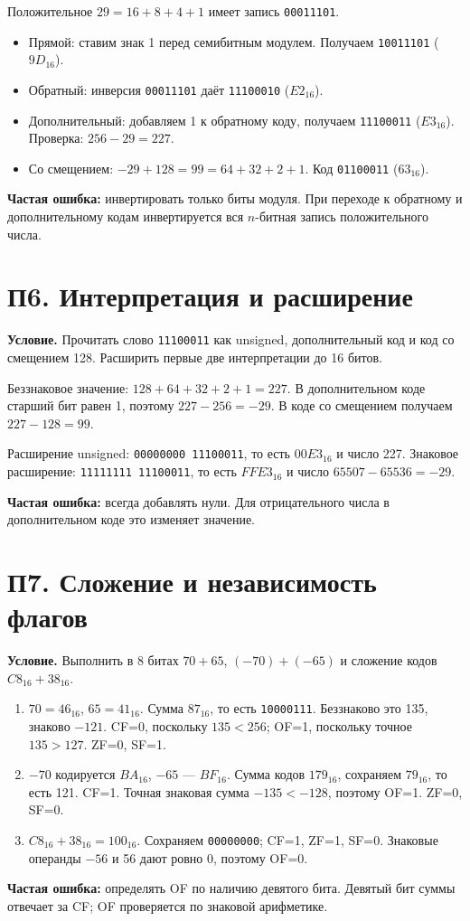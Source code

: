 Положительное $29=16+8+4+1$ имеет запись \texttt{00011101}.
\begin{itemize}
    \item Прямой: ставим знак 1 перед семибитным модулем. Получаем \texttt{10011101} ($9D_{16}$).
    \item Обратный: инверсия \texttt{00011101} даёт \texttt{11100010} ($E2_{16}$).
    \item Дополнительный: добавляем 1 к обратному коду, получаем \texttt{11100011} ($E3_{16}$). Проверка: $256-29=227$.
    \item Со смещением: $-29+128=99=64+32+2+1$. Код \texttt{01100011} ($63_{16}$).
\end{itemize}
\textbf{Частая ошибка:} инвертировать только биты модуля. При переходе к обратному и дополнительному кодам инвертируется вся $n$-битная запись положительного числа.

\section{П6. Интерпретация и расширение}\label{ex:p6}
\textbf{Условие.} Прочитать слово \texttt{11100011} как unsigned, дополнительный код и код со смещением 128. Расширить первые две интерпретации до 16 битов.

Беззнаковое значение: $128+64+32+2+1=227$.
В дополнительном коде старший бит равен 1, поэтому $227-256=-29$.
В коде со смещением получаем $227-128=99$.

Расширение unsigned: \texttt{00000000 11100011}, то есть $00E3_{16}$ и число 227.
Знаковое расширение: \texttt{11111111 11100011}, то есть $FFE3_{16}$ и число $65507-65536=-29$.

\textbf{Частая ошибка:} всегда добавлять нули. Для отрицательного числа в дополнительном коде это изменяет значение.

\section{П7. Сложение и независимость флагов}\label{ex:p7}
\textbf{Условие.} Выполнить в 8 битах $70+65$, $(-70)+(-65)$ и сложение кодов $C8_{16}+38_{16}$.

\begin{enumerate}
    \item $70=46_{16}$, $65=41_{16}$. Сумма $87_{16}$, то есть \texttt{10000111}. Беззнаково это 135, знаково $-121$. CF=0, поскольку $135<256$; OF=1, поскольку точное $135>127$. ZF=0, SF=1.
    \item $-70$ кодируется $BA_{16}$, $-65$ --- $BF_{16}$. Сумма кодов $179_{16}$, сохраняем $79_{16}$, то есть 121. CF=1. Точная знаковая сумма $-135<-128$, поэтому OF=1. ZF=0, SF=0.
    \item $C8_{16}+38_{16}=100_{16}$. Сохраняем \texttt{00000000}; CF=1, ZF=1, SF=0. Знаковые операнды $-56$ и 56 дают ровно 0, поэтому OF=0.
\end{enumerate}
\textbf{Частая ошибка:} определять OF по наличию девятого бита. Девятый бит суммы отвечает за CF; OF проверяется по знаковой арифметике.

